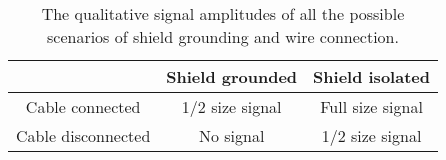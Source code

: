 \begin{table}
\centering
\begin{tabular}{ccc}
\hline
\hline
    & Shield grounded  & Shield isolated \\
\hline
Cable connected & 1/2 size signal & Full size signal \\
Cable disconnected & No signal & 1/2 size signal \\
\hline
\hline
\end{tabular}
\caption{The qualitative signal amplitudes of all the
possible scenarios of shield grounding and
wire connection.}
\label{table:crosstalk}
\end{table}
